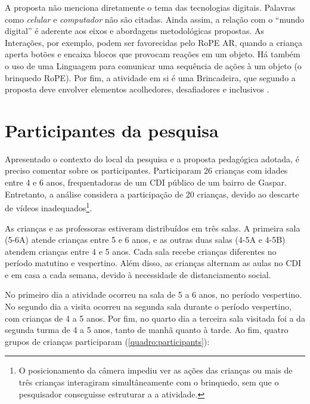 A proposta não menciona diretamente o tema das tecnologias digitais. Palavras como \textit{celular} e \textit{computador} não são citadas. Ainda assim, a relação com o “mundo digital” é aderente aos eixos e abordagens metodológicas propostas. As Interações, por exemplo, podem ser favorecidas pelo RoPE AR, quando a criança aperta botões e encaixa blocos que provocam reações em um objeto. Há também o uso de uma Linguagem para comunicar uma sequência de ações à um objeto (o brinquedo RoPE). Por fim, a atividade em si é uma Brincadeira, que segundo a proposta deve envolver elementos acolhedores, desafiadores e inclusivos \cite[p.50]{gaspar_proposta_2010}. 


\section{Participantes da pesquisa}
\label{sec:participantes}
Apresentado o contexto do local da pesquisa e a proposta pedagógica adotada, é preciso comentar sobre os participantes. Participaram 26 crianças com idades entre 4 e 6 anos, frequentadoras de um CDI público de um bairro de Gaspar. Entretanto, a análise considera a participação de 20 crianças, devido ao descarte de vídeos inadequados\footnote{O posicionamento da câmera impediu ver as ações das crianças ou mais de três crianças interagiram simultâneamente com o brinquedo, sem que o pesquisador conseguisse estruturar a a atividade.}.

As crianças e as professoras estiveram distribuídos em três salas. A primeira sala (5-6A) atende crianças entre 5 e 6 anos, e as outras duas salas (4-5A e 4-5B) atendem crianças entre 4 e 5 anos. Cada sala recebe crianças diferentes no período matutino e vespertino. Além disso, as crianças alternam as aulas no CDI e em casa a cada semana, devido à necessidade de distanciamento social.

No primeiro dia a atividade ocorreu na sala de 5 a 6 anos, no período vespertino. No segundo dia a visita ocorreu na segunda sala durante o período vespertino, com crianças de 4 a 5 anos. Por fim, no quarto dia a terceira sala visitada foi a da segunda turma de 4 a 5 anos, tanto de manhã quanto à tarde. Ao fim, quatro grupos de crianças participaram (\autoref{quadro:participants}):

